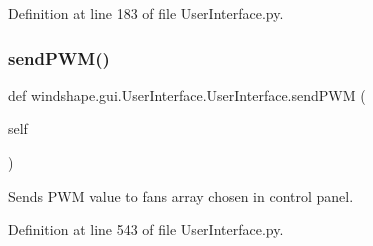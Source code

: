 Definition at line 183 of file User\+Interface.\+py.

\mbox{\label{classwindshape_1_1gui_1_1_user_interface_1_1_user_interface_a4e188b0f5fbd942b9fdc57e24363f46e}} 
\subsubsection{\texorpdfstring{send\+P\+W\+M()}{sendPWM()}}
{\footnotesize\ttfamily def windshape.\+gui.\+User\+Interface.\+User\+Interface.\+send\+P\+WM (\begin{DoxyParamCaption}\item[{}]{self }\end{DoxyParamCaption})}

\begin{DoxyVerb}Sends PWM value to fans array chosen in control panel.\end{DoxyVerb}
 

Definition at line 543 of file User\+Interface.\+py.

